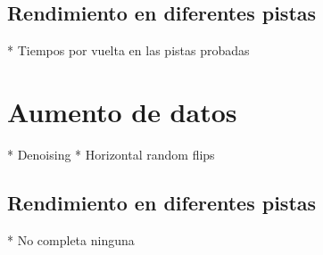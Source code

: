 \subsection{Rendimiento en diferentes pistas}
* Tiempos por vuelta en las pistas probadas



\section{Aumento de datos}
* Denoising
* Horizontal random flips

\subsection{Rendimiento en diferentes pistas}
* No completa ninguna
